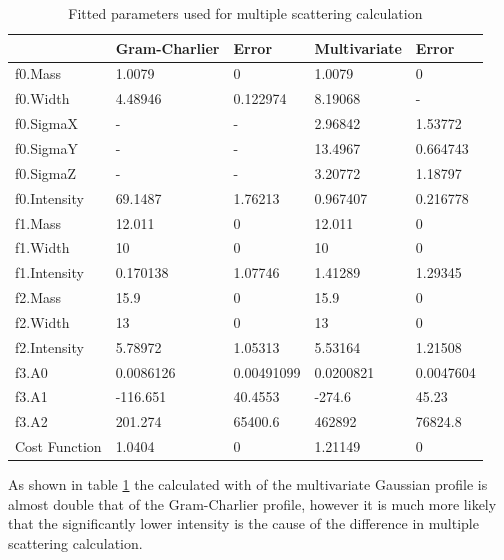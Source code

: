 \documentclass[a4paper]{article}
\begin{document}
\begin{table}[h!]
  \centering
  \begin{tabular}{lllll}
    \toprule
                  & Gram-Charlier & Error      & Multivariate & Error     \\
    \midrule
    f0.Mass       & 1.0079        & 0          & 1.0079       & 0         \\
    f0.Width      & 4.48946       & 0.122974   & 8.19068      & -         \\
    f0.SigmaX     & -             & -          & 2.96842      & 1.53772   \\
    f0.SigmaY     & -             & -          & 13.4967      & 0.664743  \\
    f0.SigmaZ     & -             & -          & 3.20772      & 1.18797   \\
    f0.Intensity  & 69.1487       & 1.76213    & 0.967407     & 0.216778  \\
    f1.Mass       & 12.011        & 0          & 12.011       & 0         \\
    f1.Width      & 10            & 0          & 10           & 0         \\
    f1.Intensity  & 0.170138      & 1.07746    & 1.41289      & 1.29345   \\
    f2.Mass       & 15.9          & 0          & 15.9         & 0         \\
    f2.Width      & 13            & 0          & 13           & 0         \\
    f2.Intensity  & 5.78972       & 1.05313    & 5.53164      & 1.21508   \\
    f3.A0         & 0.0086126     & 0.00491099 & 0.0200821    & 0.0047604 \\
    f3.A1         & -116.651      & 40.4553    & -274.6       & 45.23     \\
    f3.A2         & 201.274       & 65400.6    & 462892       & 76824.8   \\
    Cost Function & 1.0404        & 0          & 1.21149      & 0         \\
    \bottomrule
  \end{tabular}
  \caption{Fitted parameters used for multiple scattering calculation}
  \label{tab:mvg_ms_params}
\end{table}
\FloatBarrier

As shown in table \ref{tab:mvg_ms_params} the calculated with of the
multivariate Gaussian profile is almost double that of the Gram-Charlier
profile, however it is much more likely that the significantly lower intensity
is the cause of the difference in multiple scattering calculation.
\end{document}
